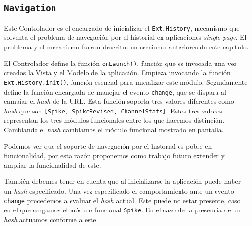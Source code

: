 	\subsection{\texttt{Navigation}}
		Este Controlador es el encargado de inicializar el \texttt{Ext.History}, mecanismo que solventa el problema de navegación por el
		historial en aplicaciones \emph{single-page}. El problema y el mecanismo fueron descritos en secciones anteriores de este capítulo.
		\par
		El Controlador define la función \texttt{onLaunch()}, función que es invocada una vez creados la Vista y el Modelo de la aplicación.
		Empieza invocando la función \texttt{Ext.History.init()}, función esencial para inicializar este módulo. Seguidamente define la
		función encargada de manejar el evento \texttt{change}, que se dispara al cambiar el \emph{hash} de la URL. Esta función soporta tres
		valores diferentes como \emph{hash} que son \texttt{[Spike, SpikeRevised, ChannelStats]}. Estos tres valores representan los tres
		módulos funcionales entre los que hacemos distinción. Cambiando el \emph{hash} cambiamos el módulo funcional mostrado en
		pantalla.
		\par
		Podemos ver que el soporte de navegación por el historial es pobre en funcionalidad, por esta razón proponemos como trabajo futuro
		extender y ampliar la funcionalidad de este.
		\par
		También debemos tener en cuenta que al inicializarse la aplicación puede haber un \emph{hash} especificado. Una vez especificado el
		comportamiento ante un evento \texttt{change} procedemos a evaluar el \emph{hash} actual. Este puede no estar presente, caso en el que
		cargamos el módulo funcional \texttt{Spike}. En el caso de la presencia de un \emph{hash} actuamos conforme a este.
